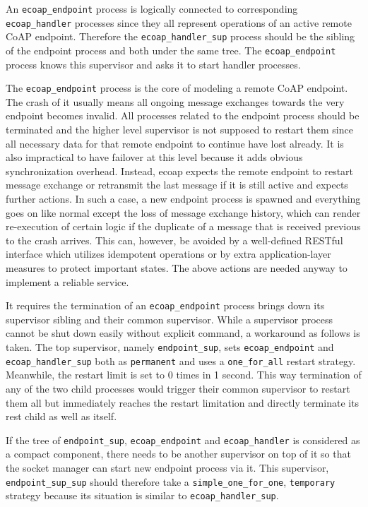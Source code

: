 An \verb|ecoap_endpoint| process is logically connected to corresponding \verb|ecoap_handler| processes since they all represent operations of an active remote CoAP endpoint. Therefore the \verb|ecoap_handler_sup| process should be the sibling of the endpoint process and both under the same tree. The \verb|ecoap_endpoint| process knows this supervisor and asks it to start handler processes.

The \verb|ecoap_endpoint| process is the core of modeling a remote CoAP endpoint. The crash of it usually means all ongoing message exchanges towards the very endpoint becomes invalid. All processes related to the endpoint process should be terminated and the higher level supervisor is not supposed to restart them since all necessary data for that remote endpoint to continue have lost already. It is also impractical to have failover at this level because it adds obvious synchronization overhead. Instead, ecoap expects the remote endpoint to restart message exchange or retransmit the last message if it is still active and expects further actions. In such a case, a new endpoint process is spawned and everything goes on like normal except the loss of message exchange history, which can render re-execution of certain logic if the duplicate of a message that is received previous to the crash arrives. This can, however, be avoided by a well-defined RESTful interface which utilizes idempotent operations or by extra application-layer measures to protect important states. The above actions are needed anyway to implement a reliable service.

It requires the termination of an \verb|ecoap_endpoint| process brings down its supervisor sibling and their common supervisor. While a supervisor process cannot be shut down easily without explicit command, a workaround as follows is taken. The top supervisor, namely \verb|endpoint_sup|, sets \verb|ecoap_endpoint| and \verb|ecoap_handler_sup| both as \verb|permanent| and uses a \verb|one_for_all| restart strategy. Meanwhile, the restart limit is set to 0 times in 1 second. This way termination of any of the two child processes would trigger their common supervisor to restart them all but immediately reaches the restart limitation and directly terminate its rest child as well as itself. 

If the tree of \verb|endpoint_sup|, \verb|ecoap_endpoint| and \verb|ecoap_handler| is considered as a compact component, there needs to be another supervisor on top of it so that the socket manager can start new endpoint process via it. This supervisor, \verb|endpoint_sup_sup| should therefore take a \verb|simple_one_for_one|, \verb|temporary| strategy because its situation is similar to \verb|ecoap_handler_sup|. 

